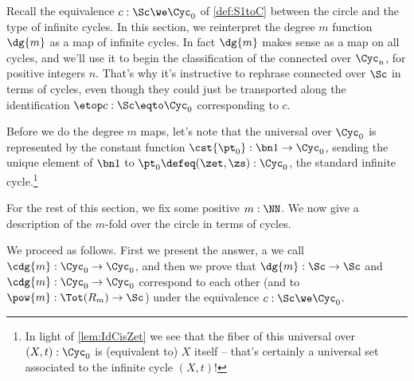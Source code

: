 Recall the equivalence $c : \Sc \we \Cyc_0$ of \cref{def:S1toC}
between the circle and the type of infinite cycles.
In this section, we reinterpret the degree $m$ function $\dg{m}$ as a
map of infinite cycles. In fact $\dg{m}$ makes sense as a map on all cycles,
and we'll use it to begin the classification
of the connected \coverings over $\Cyc_n$, for positive integers $n$.
That's why it's instructive to rephrase connected \coverings over $\Sc$
in terms of cycles, even though they could just be transported
along the identification $\etop c:\Sc\eqto\Cyc_0$ corresponding to $c$.

Before we do the degree $m$ maps, let's note that the
universal \covering over $\Cyc_0$ is represented by the constant function
$\cst{\pt_0}:\bn 1\to\Cyc_0$, sending the unique element
of $\bn 1$ to $\pt_0\defeq(\zet,\zs):\Cyc_0$, the standard infinite cycle.\footnote{%
  In light of \cref{lem:IdCisZet} we see that the fiber
  of this universal \covering over $(X,t):\Cyc_0$ is (equivalent to) $X$ itself
  -- that's certainly a universal set associated to the
  infinite cycle $(X,t)$!}

For the rest of this section, we fix some positive $m:\NN$.
We now give a description of
the $m$-fold \covering over the circle in terms of cycles.

We proceed as follows.
First we present the answer, a \covering we call $\cdg{m}:\Cyc_0\to\Cyc_0$,
and then we prove that $\dg{m}:\Sc\to\Sc$ and $\cdg{m}:\Cyc_0\to\Cyc_0$
correspond to each other (and to $\pow{m}:\Tot(R_m)\to\Sc$)
under the equivalence $c:\Sc\we\Cyc_0$.

